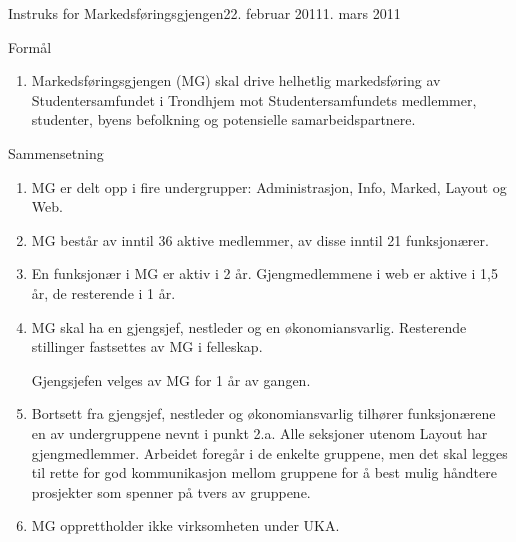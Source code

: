 \begin{instruks}{Instruks for Markedsføringsgjengen}{22. februar 2011}{1. mars 2011 }

    \begin{instruksledd}{Formål}
        \begin{enumerate}
            \item Markedsføringsgjengen (MG) skal drive helhetlig markedsføring av Studentersamfundet
                i Trondhjem mot
                Studentersamfundets medlemmer, studenter, byens befolkning og potensielle samarbeidspartnere.
        \end{enumerate}
    \end{instruksledd}

    \begin{instruksledd}{Sammensetning}
        \begin{enumerate}
            \item MG er delt opp i fire undergrupper: Administrasjon, Info, Marked, Layout og Web.
            \item MG består av inntil 36 aktive medlemmer, av disse inntil 21 funksjonærer.
            \item En funksjonær i MG er aktiv i 2 år. Gjengmedlemmene i web er aktive i 1,5 år, de
                resterende i 1 år.
            \item MG skal ha en gjengsjef, nestleder og en økonomiansvarlig. Resterende stillinger fastsettes
                av MG i felleskap.

                Gjengsjefen velges av MG for 1 år av gangen.
            \item Bortsett fra gjengsjef, nestleder og
                økonomiansvarlig tilhører funksjonærene en av undergruppene nevnt i punkt 2.a.
                Alle
                seksjoner utenom Layout har gjengmedlemmer. Arbeidet foregår i de enkelte gruppene, men det skal
                legges til
                rette for god kommunikasjon mellom gruppene for å best mulig håndtere prosjekter som spenner på
                tvers av
                gruppene.
            \item MG opprettholder ikke virksomheten under UKA.
        \end{enumerate}
    \end{instruksledd}


\end{instruks}
